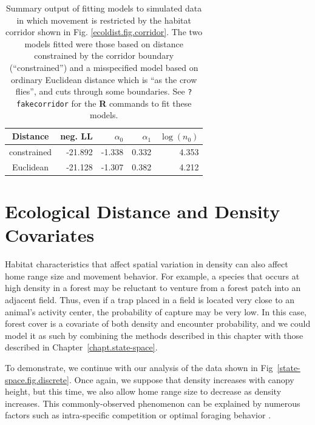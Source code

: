 \begin{table}
\centering
\caption{
Summary output of fitting models to simulated data in which movement
is restricted by the habitat corridor shown in
Fig. \ref{ecoldist.fig.corridor}. The two models fitted were those
based on distance  constrained by the corridor boundary
(``constrained'') and a misspecified model based on ordinary Euclidean
distance which is ``as the crow flies'', and cuts through some
boundaries.
See \mbox{\tt ?fakecorridor} for the {\bf R} commands to fit these
models.
}
\begin{tabular}{c|rrrr} \hline \hline
Distance    &  neg. LL &    $\alpha_0$   & $\alpha_1$    & $\log(n_0)$ \\ \hline
constrained & -21.892 &  -1.338 & 0.332 & 4.353 \\
Euclidean   & -21.128 &  -1.307 & 0.382 & 4.212 \\ \hline
\end{tabular}
\label{rsf.tab.fakecorridor}
\end{table}


\section{Ecological Distance and Density Covariates}
\label{chapt.ecoldist.sec.ssed}

Habitat characteristics that affect spatial variation in density can
also affect home range size and movement behavior. For example, a
species that occurs at high density in a forest may be reluctant to
venture from a forest patch into an adjacent field. Thus, even if a
trap placed in a field is located very close to an animal's activity
center, the probability of capture may be very
low. In this case, forest cover is a covariate of
both density and encounter probability,
and we could model it as such by combining the methods described in
this chapter with those described in Chapter~\ref{chapt.state-space}.

To demonstrate, we continue with our analysis of the data shown in
Fig~\ref{state-space.fig.discrete}. Once again, we suppose that density
increases with canopy height, but this time, we also allow
home range size to decrease as density increases. This
commonly-observed phenomenon can be explained by numerous factors such
as intra-specific competition \citep{sillett_etal:2004} or optimal
foraging behavior \citep{tufto_etal:1996,said_servanty:2005}.


